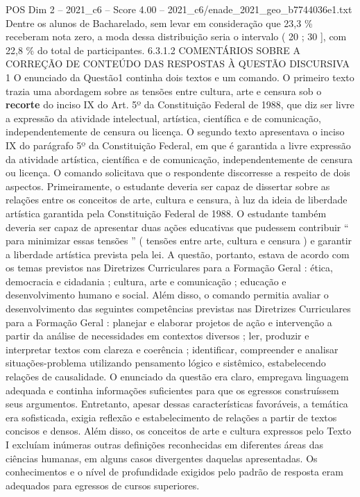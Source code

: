 \begin{textsample}{POS Dim 2 – 2021\_c6 – Score 4.00 – 2021\_c6/enade\_2021\_geo\_b7744036e1.txt}
Dentre os alunos de Bacharelado, sem levar em consideração que 23,3 \% receberam nota zero, a moda dessa distribuição seria o intervalo ( 20 ; 30 ], com 22,8 \% do total de participantes. 6.3.1.2 COMENTÁRIOS SOBRE A CORREÇÃO DE CONTEÚDO DAS RESPOSTAS À QUESTÃO DISCURSIVA 1 O enunciado da Questão1 continha dois textos e um comando.
O primeiro texto trazia uma abordagem sobre as tensões entre cultura, arte e censura sob o \textbf{recorte} do inciso IX do Art. 5º da Constituição Federal de 1988, que diz ser livre a expressão da atividade intelectual, artística, científica e de comunicação, independentemente de censura ou licença.
O segundo texto apresentava o inciso IX do parágrafo 5º da Constituição Federal, em que é garantida a livre expressão da atividade artística, científica e de comunicação, independentemente de censura ou licença.
O comando solicitava que o respondente discorresse a respeito de dois aspectos.
Primeiramente, o estudante deveria ser capaz de dissertar sobre as relações entre os conceitos de arte, cultura e censura, à luz da ideia de liberdade artística garantida pela Constituição Federal de 1988.
O estudante também deveria ser capaz de apresentar duas ações educativas que pudessem contribuir “ para minimizar essas tensões ” ( tensões entre arte, cultura e censura ) e garantir a liberdade artística prevista pela lei.
A questão, portanto, estava de acordo com os temas previstos nas Diretrizes Curriculares para a Formação Geral : ética, democracia e cidadania ; cultura, arte e comunicação ; educação e desenvolvimento humano e social.
Além disso, o comando permitia avaliar o desenvolvimento das seguintes competências previstas nas Diretrizes Curriculares para a Formação Geral : planejar e elaborar projetos de ação e intervenção a partir da análise de necessidades em contextos diversos ; ler, produzir e interpretar textos com clareza e coerência ; identificar, compreender e analisar situações-problema utilizando pensamento lógico e sistêmico, estabelecendo relações de causalidade.
O enunciado da questão era claro, empregava linguagem adequada e continha informações suficientes para que os egressos construíssem seus argumentos.
Entretanto, apesar dessas características favoráveis, a temática era sofisticada, exigia reflexão e estabelecimento de relações a partir de textos concisos e densos.
Além disso, os conceitos de arte e cultura expressos pelo Texto I excluíam inúmeras outras definições reconhecidas em diferentes áreas das ciências humanas, em alguns casos divergentes daquelas apresentadas.
Os conhecimentos e o nível de profundidade exigidos pelo padrão de resposta eram adequados para egressos de cursos superiores.

\end{textsample}
